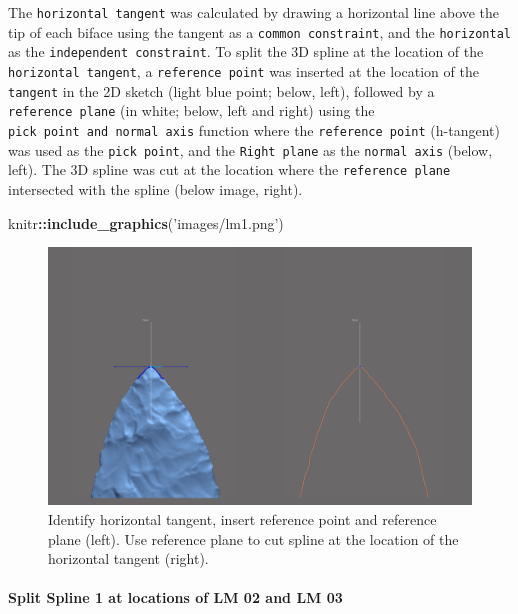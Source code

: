 \documentclass[
]{article}
\newenvironment{Shaded}{\begin{snugshade}}{\end{snugshade}}
\newcommand{\KeywordTok}[1]{\textcolor[rgb]{0.13,0.29,0.53}{\textbf{#1}}}
\newcommand{\NormalTok}[1]{#1}
\newcommand{\OperatorTok}[1]{\textcolor[rgb]{0.81,0.36,0.00}{\textbf{#1}}}
\newcommand{\StringTok}[1]{\textcolor[rgb]{0.31,0.60,0.02}{#1}}
\begin{document}
The \texttt{horizontal\ tangent} was calculated by drawing a horizontal
line above the tip of each biface using the tangent as a
\texttt{common\ constraint}, and the \texttt{horizontal} as the
\texttt{independent\ constraint}. To split the 3D spline at the location
of the \texttt{horizontal\ tangent}, a \texttt{reference\ point} was
inserted at the location of the \texttt{tangent} in the 2D sketch (light
blue point; below, left), followed by a \texttt{reference\ plane} (in
white; below, left and right) using the
\texttt{pick\ point\ and\ normal\ axis} function where the
\texttt{reference\ point} (h-tangent) was used as the
\texttt{pick\ point}, and the \texttt{Right\ plane} as the
\texttt{normal\ axis} (below, left). The 3D spline was cut at the
location where the \texttt{reference\ plane} intersected with the spline
(below image, right).

\begin{Shaded}
\begin{Highlighting}[]
\NormalTok{knitr}\OperatorTok{::}\KeywordTok{include_graphics}\NormalTok{(}\StringTok{'images/lm1.png'}\NormalTok{)}
\end{Highlighting}
\end{Shaded}

\begin{figure}
\includegraphics[width=1\linewidth]{images/lm1} \caption{Identify horizontal tangent, insert reference point and reference plane (left). Use reference plane to cut spline at the location of the horizontal tangent (right).}\label{fig:figlm1}
\end{figure}

\hypertarget{split-spline-1-at-locations-of-lm-02-and-lm-03}{%
\paragraph{Split Spline 1 at locations of LM 02 and LM
03}\label{split-spline-1-at-locations-of-lm-02-and-lm-03}}
\end{document}
